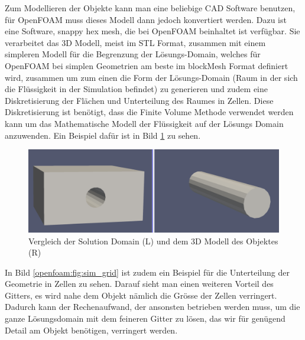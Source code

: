Zum Modellieren der Objekte kann man eine beliebige CAD Software benutzen, für OpenFOAM muss dieses Modell dann jedoch konvertiert werden.
Dazu ist eine Software, snappy hex  mesh, die bei OpenFOAM beinhaltet ist verfügbar.
Sie verarbeitet das 3D Modell, meist im STL Format, zusammen mit einem simpleren Modell für die Begrenzung der Lösungs-Domain, welches für OpenFOAM bei simplen Geometrien am beste im blockMesh Format definiert wird, zusammen um zum einen die Form der Lösungs-Domain (Raum in der sich die Flüssigkeit in der Simulation befindet) zu generieren und zudem eine Diskretisierung der Flächen und Unterteilung des Raumes in Zellen.
Diese Diskretisierung ist benötigt, dass die Finite Volume Methode verwendet werden kann um das Mathematische Modell der Flüssigkeit auf der Lösungs Domain anzuwenden.
Ein Beispiel dafür ist in Bild \ref{openfoam:fig:SD_Modell_vergleich} zu sehen.
\begin{figure}[h]
	\centering
	\includegraphics[scale=0.1]{papers/openfoam/Bilder/vergleich_solution_domain_object.png}
	\caption{Vergleich der Solution Domain (L) und dem 3D Modell des Objektes (R)}
	\label{openfoam:fig:SD_Modell_vergleich}
\end{figure}

In Bild \ref{openfoam:fig:sim_grid} ist zudem ein Beispiel für die Unterteilung der Geometrie in Zellen zu sehen.
Darauf sieht man einen weiteren Vorteil des Gitters, es wird nahe dem Objekt nämlich die Grösse der Zellen verringert.
Dadurch kann der Rechenaufwand, der ansonsten betrieben werden muss, um die ganze Lösungsdomain mit dem feineren Gitter zu lösen, das wir für genügend Detail am Objekt benötigen, verringert werden.

